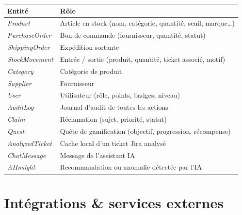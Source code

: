 \documentclass[11pt,a4paper]{article}
\begin{document}
\begin{center}
\begin{tabularx}{\linewidth}{@{}lX@{}}
\toprule
\textbf{Entité} & \textbf{Rôle}\\
\midrule
\textit{Product}          & Article en stock (nom, catégorie, quantité, seuil, marque\dots)\\
\textit{PurchaseOrder}    & Bon de commande (fournisseur, quantité, statut)\\
\textit{ShippingOrder}    & Expédition sortante \\
\textit{StockMovement}    & Entrée / sortie (produit, quantité, ticket associé, motif)\\
\textit{Category}         & Catégorie de produit \\
\textit{Supplier}         & Fournisseur \\
\textit{User}             & Utilisateur (rôle, points, badges, niveau)\\
\textit{AuditLog}         & Journal d'audit de toutes les actions \\
\textit{Claim}            & Réclamation (sujet, priorité, statut)\\
\textit{Quest}            & Quête de gamification (objectif, progression, récompense)\\
\textit{AnalyzedTicket}   & Cache local d'un ticket Jira analysé \\
\textit{ChatMessage}      & Message de l'assistant IA \\
\textit{AIInsight}        & Recommandation ou anomalie détectée par l'IA \\
\bottomrule
\end{tabularx}
\end{center}

\section{Intégrations \& services externes}
\end{document}
